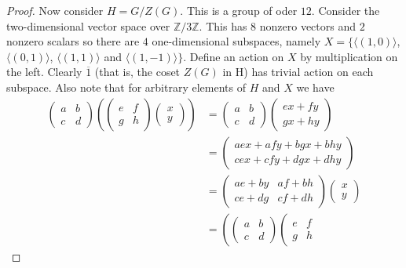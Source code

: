 \documentclass{article}
\begin{document}
\begin{proof}
Now consider $H = G/Z(G)$. This is a group of oder $12$. Consider the two-dimensional vector space over $\mathbb{Z}/3\mathbb{Z}$. This has $8$ nonzero vectors and $2$ nonzero scalars so there are $4$ one-dimensional subspaces, namely $X = \{\langle (1,0) \rangle$, $\langle (0,1) \rangle$, $\langle (1,1) \rangle$ and $\langle (1,-1) \rangle \}$. Define an action on $X$ by multiplication on the left. Clearly $\overline{1}$ (that is, the coset $Z(G)$ in H) has trivial action on each subspace. Also note that for arbitrary elements of $H$ and $X$ we have
\begin{align*}
\left (
\begin{array}{cc}
a & b\\
c & d
\end{array}
\right )
\left ( \left (
\begin{array}{cc}
e & f\\
g & h
\end{array}
\right ) \left (
\begin{array}{c}
x\\
y
\end{array}
\right ) \right )
&= \left (
\begin{array}{cc}
a & b\\
c & d
\end{array}
\right ) \left (
\begin{array}{c}
ex + fy\\
gx + hy
\end{array}
\right )\\
&= \left (
\begin{array}{c}
aex + afy + bgx + bhy\\
cex + cfy + dgx + dhy
\end{array}
\right )\\
&= \left (
\begin{array}{cc}
ae + by & af + bh\\
ce + dg & cf + dh
\end{array}
\right ) \left (
\begin{array}{c}
x\\
y
\end{array}
\right )\\
&= \left ( \left (
\begin{array}{cc}
a & b\\
c & d
\end{array}
\right ) \left (
\begin{array}{cc}
e & f\\
g & h
\end{array}

\end{align*}
\end{proof}
\end{document}
